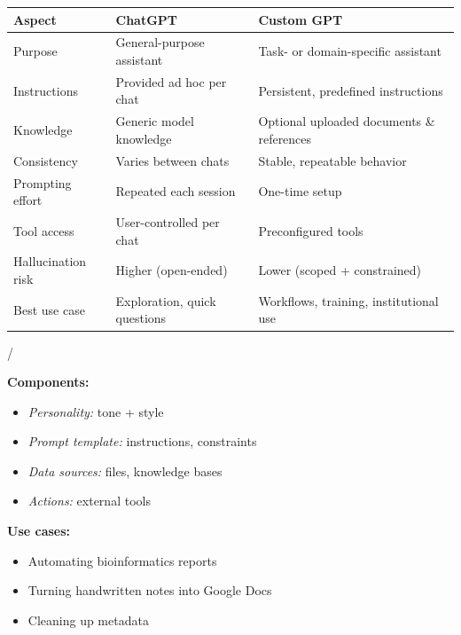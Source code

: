 \documentclass[
  letterpaper,
  DIV=11,
  numbers=noendperiod]{scrreprt}
\begin{document}
\begin{longtable}[]{@{}
  >{\raggedright\arraybackslash}p{}
  >{\raggedright\arraybackslash}p{}
  >{\raggedright\arraybackslash}p{}@{}}
\toprule\noalign{}
\begin{minipage}[b]{\linewidth}\raggedright
Aspect
\end{minipage} & \begin{minipage}[b]{\linewidth}\raggedright
ChatGPT
\end{minipage} & \begin{minipage}[b]{\linewidth}\raggedright
Custom GPT
\end{minipage} \\
\midrule\noalign{}
\endhead
\bottomrule\noalign{}
\endlastfoot
Purpose & General-purpose assistant & Task- or domain-specific
assistant \\
Instructions & Provided ad hoc per chat & Persistent, predefined
instructions \\
Knowledge & Generic model knowledge & Optional uploaded documents \&
references \\
Consistency & Varies between chats & Stable, repeatable behavior \\
Prompting effort & Repeated each session & One-time setup \\
Tool access & User-controlled per chat & Preconfigured tools \\
Hallucination risk & Higher (open-ended) & Lower (scoped +
constrained) \\
Best use case & Exploration, quick questions & Workflows, training,
institutional use \\
\end{longtable}

/

\textbf{Components:}

\begin{itemize}
\item
  \emph{Personality:} tone + style
\item
  \emph{Prompt template:} instructions, constraints
\item
  \emph{Data sources:} files, knowledge bases
\item
  \emph{Actions:} external tools
\end{itemize}

\textbf{Use cases:}

\begin{itemize}
\item
  Automating bioinformatics reports
\item
  Turning handwritten notes into Google Docs
\item
  Cleaning up metadata
\end{itemize}
\end{document}
